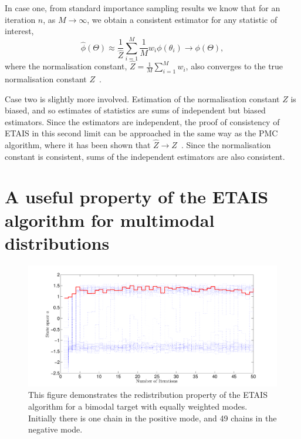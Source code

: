 \documentclass[final]{siamltex}
\begin{document}
In case one, from standard importance sampling results we know that for an iteration $n$, as $M\rightarrow\infty$, we obtain a consistent estimator for any statistic of interest,
\[
	\hat{\phi}(\Theta) \approx \frac{1}{\hat{Z}}\sum\limits_{i=1}^M \! \frac{1}{M}w_i\phi(\theta_i) \rightarrow \phi(\Theta),
\]
where the normalisation constant, $\hat{Z} = \frac{1}{M}\sum_{i=1}^M \! w_i$, also converges to the true normalisation constant $Z$~\cite{robert2013monte}.

Case two is slightly more involved. Estimation of the normalisation constant $Z$ is biased, and so estimates of statistics are sums of independent but biased estimators. Since the estimators are independent, the proof of consistency of ETAIS in this second limit can be approached in the same way as the PMC algorithm, where it has been shown that $\hat{Z}\rightarrow Z$~\cite{robert2013monte}. Since the normalisation constant is consistent, sums of the independent estimators are also consistent.


{\red
\section{A useful property of the ETAIS algorithm for multimodal
  distributions} } \label{sec:useful}

\begin{figure}[!ht]
\begin{center}
\includegraphics[width=\textwidth]{"figures/BM2_suction"}
\caption{This figure demonstrates the redistribution property of the
ETAIS algorithm for a bimodal target with equally weighted modes. Initially there is one chain in the positive mode, and
49 chains in the negative mode.}
\label{fig:BM2_suction}
\end{center}
\end{figure}
\end{document}

